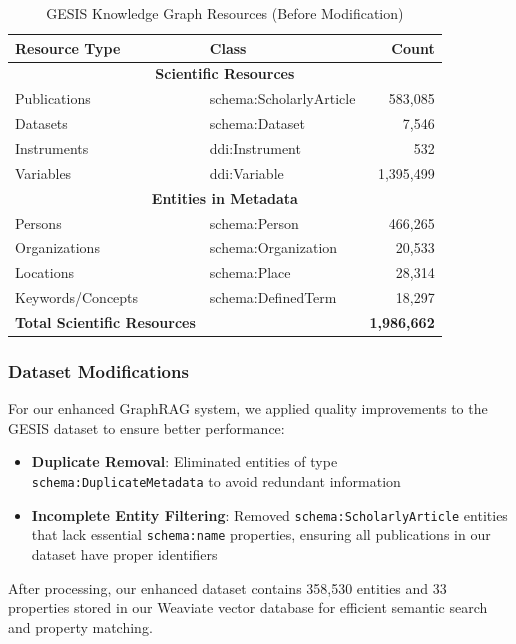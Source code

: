 \begin{table}[htbp]
\centering
\renewcommand{\arraystretch}{1.15}
\setlength{\tabcolsep}{12pt}
\caption{GESIS Knowledge Graph Resources (Before Modification)}
\begin{tabular}{| l | l | r |}
\hline
\textbf{Resource Type} & \textbf{Class} & \textbf{Count} \\
\hline
\multicolumn{3}{|c|}{\textbf{Scientific Resources}} \\
\hline
Publications & schema:ScholarlyArticle & 583,085 \\
Datasets & schema:Dataset & 7,546 \\
Instruments & ddi:Instrument & 532 \\
Variables & ddi:Variable & 1,395,499 \\
\hline
\multicolumn{3}{|c|}{\textbf{Entities in Metadata}} \\
\hline
Persons & schema:Person & 466,265 \\
Organizations & schema:Organization & 20,533 \\
Locations & schema:Place & 28,314 \\
Keywords/Concepts & schema:DefinedTerm & 18,297 \\
\hline
\textbf{Total Scientific Resources} & & \textbf{1,986,662} \\
\hline
\end{tabular}
\label{table-gesis-resources}
\end{table}

\subsubsection{Dataset Modifications}
For our enhanced GraphRAG system, we applied quality improvements to the GESIS dataset to ensure better performance:

\begin{itemize}
    \item \textbf{Duplicate Removal}: Eliminated entities of type \texttt{schema:DuplicateMetadata} to avoid redundant information
    \item \textbf{Incomplete Entity Filtering}: Removed \texttt{schema:ScholarlyArticle} entities that lack essential \texttt{schema:name} properties, ensuring all publications in our dataset have proper identifiers
\end{itemize}

After processing, our enhanced dataset contains 358,530 entities and 33 properties stored in our Weaviate vector database for efficient semantic search and property matching.

